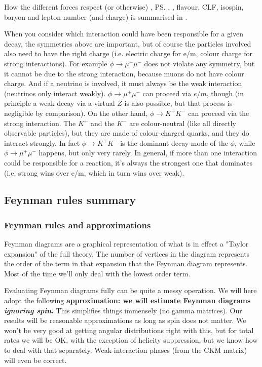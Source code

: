 How the different forces respect (or otherwise) \cs, \ps, \cp, flavour, CLF, isospin, baryon and lepton number (and charge) is summarised in .

When you consider which interaction could have been responsible for a given decay, the symmetries above are important, but of course the particles involved also need to have the right charge (i.e. electric charge for e/m, colour charge for strong interactions). For example $\phi \to \mu^+ \mu^-$ does not violate any symmetry, but it cannot be due to the strong interaction, because muons do not have colour charge. And if a neutrino is involved, it must always be the weak interaction (neutrinos only interact weakly). $\phi \to \mu^+ \mu^-$ can proceed via $e/m$, though (in principle a weak decay via a virtual $Z$ is also possible, but that process is negligible by comparison). On the other hand, $\phi \to K^+ K^-$ can proceed via the strong interaction. The $K^+$ and the $K^-$ are colour-neutral (like all directly observable particles), but they are made of colour-charged quarks, and they do interact strongly. In fact $\phi \to K^+ K^-$ is the dominant decay mode of the $\phi$, while $\phi \to \mu^+ \mu^-$ happens, but only very rarely. In general, if more than one interaction could be responsible for a reaction, it's always the strongest one that dominates (i.e. strong wins over e/m, which in turn wins over weak).

\subsection{Feynman rules summary}
\subsubsection{Feynman rules and approximations}
Feynman diagrams are a graphical representation of what is in effect a "Taylor expansion" of the full theory. The number of vertices in the diagram represents the order of the term in that expansion that the Feynman diagram represents. Most of the time we'll only deal with the lowest order term.

Evaluating Feynman diagrams fully can be quite a messy operation. We will here adopt the following \textbf{approximation: we will estimate Feynman diagrams \emph{ignoring spin}.} This simplifies things immensely (no gamma matrices). Our results will be reasonable approximations as long as spin does not matter. We won't be very good at getting angular distributions right with this, but for total rates we will be OK, with the exception of helicity suppression, but we know how to deal with that separately. Weak-interaction phases (from the CKM matrix) will even be correct.

